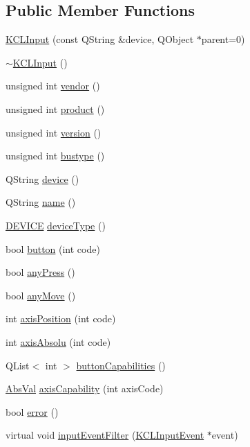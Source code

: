 \subsection*{Public Member Functions}
\begin{CompactItemize}
\item 
\hyperlink{class_k_c_l_input_8be2188910f86e335d36694068eab677}{KCLInput} (const QString \&device, QObject $\ast$parent=0)
\item 
\hyperlink{class_k_c_l_input_aea38929accc31d9f27c08b5d4119fe3}{$\sim$KCLInput} ()
\item 
unsigned int \hyperlink{class_k_c_l_input_8b974c847387834722f09ac5725f3c68}{vendor} ()
\item 
unsigned int \hyperlink{class_k_c_l_input_89c31b5c39e1f052d3408cb34861be51}{product} ()
\item 
unsigned int \hyperlink{class_k_c_l_input_53ebfb56b5039bdeb8b6bed4bbff1b0e}{version} ()
\item 
unsigned int \hyperlink{class_k_c_l_input_5636bb74f7e17ad8b09dcbbc3be2a736}{bustype} ()
\item 
QString \hyperlink{class_k_c_l_input_99047eea6d01d09f72a49dd219ce44e9}{device} ()
\item 
QString \hyperlink{class_k_c_l_input_0214f0e500c4eccdb7afacaf78019b14}{name} ()
\item 
\hyperlink{kclinput_8h_833b28f90e109607cd5d9e826474893a}{DEVICE} \hyperlink{class_k_c_l_input_cbbc1f4e0b0e7869d88173603f2f0c68}{deviceType} ()
\item 
bool \hyperlink{class_k_c_l_input_afe120b671d76b4b7d14b48e03d4faf6}{button} (int code)
\item 
bool \hyperlink{class_k_c_l_input_c3740f546a1992b7855549405c81dc7b}{anyPress} ()
\item 
bool \hyperlink{class_k_c_l_input_28b17185d4d20c96ef67a7bc287f5908}{anyMove} ()
\item 
int \hyperlink{class_k_c_l_input_80bd12aea5ae92a327af1db942ef25b9}{axisPosition} (int code)
\item 
int \hyperlink{class_k_c_l_input_5546e3862c917d07b22543190659871d}{axisAbsolu} (int code)
\item 
QList$<$ int $>$ \hyperlink{class_k_c_l_input_ae4174869c6bf29b6c59afa58c718275}{buttonCapabilities} ()
\item 
\hyperlink{class_abs_val}{AbsVal} \hyperlink{class_k_c_l_input_72c70fa38d90216025a913a1255ce935}{axisCapability} (int axisCode)
\item 
bool \hyperlink{class_k_c_l_input_0c3b7dd3cce5d5567c4894500074fee3}{error} ()
\item 
virtual void \hyperlink{class_k_c_l_input_ee93fa33ec6a14baf2acf3daf23607c0}{inputEventFilter} (\hyperlink{class_k_c_l_input_event}{KCLInputEvent} $\ast$event)
\end{CompactItemize}
